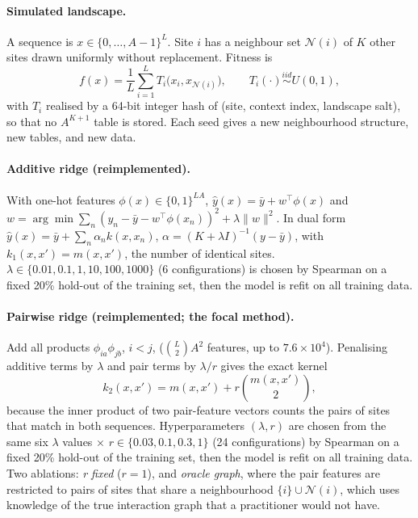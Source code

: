 \paragraph{Simulated landscape.} A sequence is $x\in\{0,\dots,A-1\}^L$. Site $i$ has a neighbour set $\mathcal N(i)$ of $K$ other sites drawn uniformly without replacement. Fitness is
\begin{equation}
f(x)=\frac1L\sum_{i=1}^{L} T_i\big(x_i,x_{\mathcal N(i)}\big),\qquad T_i(\cdot)\overset{iid}{\sim}U(0,1),
\end{equation}
with $T_i$ realised by a 64-bit integer hash of (site, context index, landscape salt), so that no $A^{K+1}$ table is stored. Each seed gives a new neighbourhood structure, new tables, and new data.

\paragraph{Additive ridge (reimplemented).} With one-hot features $\phi(x)\in\{0,1\}^{LA}$, $\hat y(x)=\bar y+w^\top\phi(x)$ and $w=\arg\min\sum_n(y_n-\bar y-w^\top\phi(x_n))^2+\lambda\|w\|^2$. In dual form $\hat y(x)=\bar y+\sum_n\alpha_n k(x,x_n)$, $\alpha=(K+\lambda I)^{-1}(y-\bar y)$, with $k_1(x,x')=m(x,x')$, the number of identical sites. $\lambda\in\{0.01,0.1,1,10,100,1000\}$ (6 configurations) is chosen by Spearman on a fixed 20\% hold-out of the training set, then the model is refit on all training data.

\paragraph{Pairwise ridge (reimplemented; the focal method).} Add all products $\phi_{ia}\phi_{jb}$, $i<j$, ($\binom L2A^2$ features, up to $7.6\times10^4$). Penalising additive terms by $\lambda$ and pair terms by $\lambda/r$ gives the exact kernel
\begin{equation}
k_2(x,x')=m(x,x')+r\binom{m(x,x')}{2},
\end{equation}
because the inner product of two pair-feature vectors counts the pairs of sites that match in both sequences. Hyperparameters $(\lambda,r)$ are chosen from the same six $\lambda$ values $\times$ $r\in\{0.03,0.1,0.3,1\}$ (24 configurations) by Spearman on a fixed 20\% hold-out of the training set, then the model is refit on all training data. Two ablations: \emph{r fixed} ($r=1$), and \emph{oracle graph}, where the pair features are restricted to pairs of sites that share a neighbourhood $\{i\}\cup\mathcal N(i)$, which uses knowledge of the true interaction graph that a practitioner would not have.

